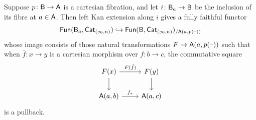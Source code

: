 \documentclass[a4paper,11pt]{article}
\begin{document}
\begin{cor}\label{cor:fibrelkeff}
  Suppose $p \colon \oB \to \oA$ is a cartesian fibration, and let $i
  \colon \oB_{a} \to \oB$ be the inclusion of its fibre at $a \in
  \textup{\textsf{A}}$. Then left Kan extension along $i$ gives a fully faithful
  functor
  \[ \textup{\textsf{Fun}}(\textup{\textsf{B}}_{a}, \textup{\textsf{Cat}}_{(\infty,n)}) \hookrightarrow \textup{\textsf{Fun}}(\textup{\textsf{B}},
    \textup{\textsf{Cat}}_{(\infty,n)})_{/\textup{\textsf{A}}(a,p(\text{\textendash}))} \]
  whose image consists of those natural transformations $F \to
  \oA(a,p(\blank))$ such that when $\bar{f} \colon x \to y$ is a
  cartesian morphism over $f \colon b \to c$, the commutative square
  \[
    \begin{tikzcd}
      F(x) \ar[r, "F(\bar{f})"] \ar[d] & F(y) \ar[d]  \\
      \oA(a,b) \ar[r, "f_{*}"] & \oA(a,c)
    \end{tikzcd}
  \]
  is a pullback.
\end{cor}
\end{document}
